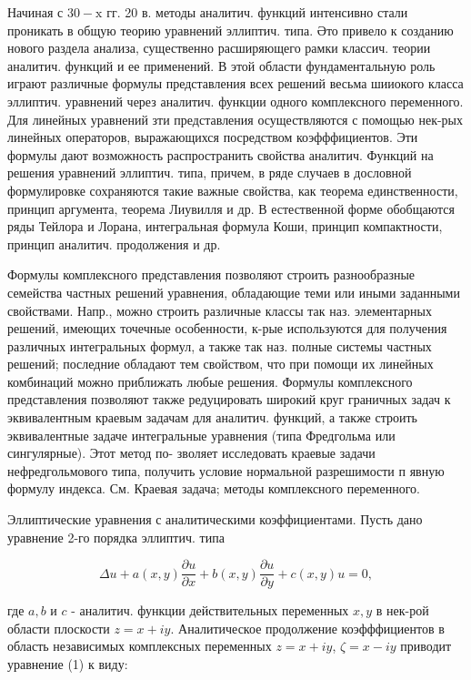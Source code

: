 \documentclass[10pt]{article}
\begin{document}
Начиная с $30-\mathrm{x}$ гг. 20 в. методы аналитич. функций интенсивно стали проникать в общую теорию уравнений эллиптич. типа. Әто привело к созданию нового раздела анализа, существенно расширяющего рамки классич. теории аналитич. функций и ее применений. В этой области фундаментальную роль играют различные формулы представления всех решений весьма шииокого класса эллиптич. уравнений через аналитич. функции одного комплексного переменного. Для линейных уравнений зти представления осуществляются с помощью нек-рых линейных операторов, выражающихся посредством коэфффициентов. Эти формулы дают возможность распространить свойства аналитич. Функций на решения уравнений эллиптич. типа, причем, в ряде случаев в дословной формулировке сохраняются такие важные свойства, как теорема единственности, принцип аргумента, теорема Лиувилля и др. В естественной форме обобщаются ряды Тейлора и Лорана, интегральная формула Коши, принцип компактности, принцип аналитич. продолжения и др.



Формулы комплексного представления позволяют строить разнообразные семейства частных решений уравнения, обладающие теми или иными заданными свойствами. Напр., можно строить различные классы так наз. элементарных решений, имеющих точечные особенности, к-рые используются для получения различных интегральных формул, а также так наз. полные системы частных решений; последние обладают тем свойством, что при помощи их линейных комбинаций можно приближать любые решения. Формулы комплексного представления позволяют также редуцировать широкий круг граничных задач к эквивалентным краевым задачам для аналитич. функций, а также строить эквивалентные задаче интегральные уравнения (типа Фредгольма или сингулярные). Этот метод по- зволяет исследовать краевые задачи нефредгольмового типа, получить условие нормальной разрешимости п явную формулу индекса. См. Краевая задача; методы комплексного переменного.



Эллиптические уравнения с аналитическими коэффициентами. Пусть дано уравнение 2-го порядка эллиптич. типа



\[

\Delta u+a(x, y) \frac{\partial u}{\partial x}+b(x, y) \frac{\partial u}{\partial y}+c(x, y) u=0,

\]



где $a, b$ и $c$ - аналитич. функции действительных переменных $x, y$ в нек-рой области плоскости $z=x+i y$. Аналитическое продолжение коэфффициентов в область независимых комплексных переменных $z=x+i y$, $\zeta=x-i y$ приводит уравнение (1) к виду:
\end{document}
